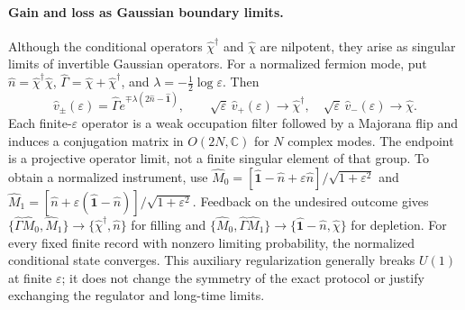 \paragraph*{Gain and loss as Gaussian boundary limits.}
Although the conditional operators $\hat\chi^\dagger$ and $\hat\chi$ are
nilpotent, they arise as singular limits of invertible Gaussian operators.
For a normalized fermion mode, put
$\hat n=\hat\chi^\dagger\hat\chi$,
$\hat\Gamma=\hat\chi+\hat\chi^\dagger$, and
$\lambda=-\tfrac12\log\varepsilon$. Then
\begin{equation}
 \hat v_\pm(\varepsilon)
 =\hat\Gamma e^{\mp\lambda(2\hat n-\hat{\mathbf{1}})},\qquad
 \sqrt\varepsilon\,\hat v_+(\varepsilon)\to\hat\chi^\dagger,
 \quad
 \sqrt\varepsilon\,\hat v_-(\varepsilon)\to\hat\chi.
 \label{eq:GainLossGaussianBoundary}
\end{equation}
Each finite-$\varepsilon$ operator is a weak occupation filter followed
by a Majorana flip and induces a conjugation matrix in
$O(2N,\mathbb C)$ for $N$ complex modes. The endpoint is a projective
operator limit, not a finite singular element of that group. To obtain a
normalized instrument, use
$\hat M_0=[\hat{\mathbf{1}}-\hat n+\varepsilon\hat n]/\sqrt{1+\varepsilon^2}$
and
$\hat M_1=[\hat n+\varepsilon(\hat{\mathbf{1}}-\hat n)]/\sqrt{1+\varepsilon^2}$.
Feedback on the undesired outcome gives
$\{\hat\Gamma\hat M_0,\hat M_1\}\to\{\hat\chi^\dagger,\hat n\}$
for filling and
$\{\hat M_0,\hat\Gamma\hat M_1\}\to
\{\hat{\mathbf{1}}-\hat n,\hat\chi\}$ for depletion. For every fixed
finite record with nonzero limiting probability, the normalized
conditional state converges. This auxiliary regularization generally
breaks $U(1)$ at finite $\varepsilon$; it does not change the symmetry of
the exact protocol or justify exchanging the regulator and long-time
limits.
